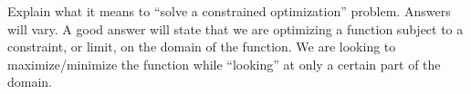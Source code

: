 {Explain what it means to ``solve a constrained optimization'' problem.
}
{
Answers will vary. A good answer will state that we are optimizing a function subject to a constraint, or limit, on the domain of the function. We are looking to maximize/minimize the function while ``looking'' at only a certain part of the domain.
}